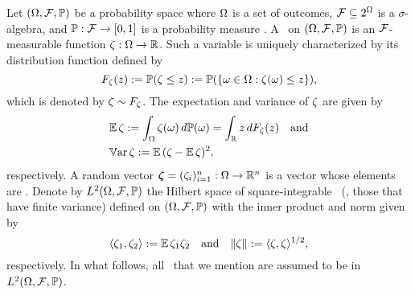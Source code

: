 Let $(\Omega, \mathcal{F}, \mathbb{P})$ be a probability space where $\Omega$ is a set of
outcomes, $\mathcal{F} \subseteq 2^\Omega$ is a $\sigma$-algebra, and
$\mathbb{P}: \mathcal{F} \to [0, 1]$ is a probability measure
\cite{durrett2010}. A \rv\ on $(\Omega, \mathcal{F}, \mathbb{P})$ is an
$\mathcal{F}$-measurable function $\zeta: \Omega \to \mathbb{R}$. Such a variable
is uniquely characterized by its distribution function defined by
\begin{equation*}
  F_\zeta(z) := \mathbb{P}(\zeta \leq z) := \mathbb{P}(\{ \omega \in \Omega: \zeta(\omega) \leq z \}),
\end{equation*}
which is denoted by $\zeta \sim F_\zeta$. The expectation and variance of
$\zeta$ are given by
\begin{align*}
  & \mathbb{E} \, \zeta := \int_\Omega \zeta(\omega) \, d\mathbb{P}(\omega) = \int_{\mathbb{R}} z \, d F_\zeta(z) \hspace{1em} \text{and} \\
  & \mathbb{V}\text{ar} \, \zeta := \mathbb{E} \, (\zeta - \mathbb{E} \, \zeta)^2,
\end{align*}
respectively. A random vector $\bm{\zeta} = (\zeta_i)_{i = 1}^n: \Omega \to \mathbb{R}^n$ is
a vector whose elements are \rvs. Denote by $L^{2}(\Omega, \mathcal{F}, \mathbb{P})$ the Hilbert
space of square-integrable \rvs\ (\ie, those that have finite variance) defined
on $(\Omega, \mathcal{F}, \mathbb{P})$ with the inner product and norm given by
\begin{equation*}
  \langle \zeta_1, \zeta_2 \rangle := \mathbb{E} \, \zeta_1 \zeta_2 \hspace{1em} \text{and} \hspace{1em} \| \zeta \|_{} := \langle \zeta, \zeta \rangle^{1/2},
\end{equation*}
respectively. In what follows, all \rvs\ that we mention are assumed to be in
$L^{2}(\Omega, \mathcal{F}, \mathbb{P})$.
